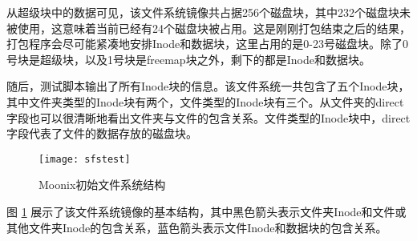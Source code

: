 从超级块中的数据可见，该文件系统镜像共占据256个磁盘块，其中232个磁盘块未被使用，这意味着当前已经有24个磁盘块被占用。这是刚刚打包结束之后的结果，打包程序会尽可能紧凑地安排Inode和数据块，这里占用的是0-23号磁盘块。除了0号块是超级块，以及1号块是freemap块之外，剩下的都是Inode和数据块。

随后，测试脚本输出了所有Inode块的信息。该文件系统一共包含了五个Inode块，其中文件夹类型的Inode块有两个，文件类型的Inode块有三个。从文件夹的direct字段也可以很清晰地看出文件夹与文件的包含关系。文件类型的Inode块中，direct字段代表了文件的数据存放的磁盘块。

\begin{figure}[htpb]
	\centering
	\texttt{[image: sfstest]}
	\setlength{\abovecaptionskip}{2pt}
	\caption{Moonix初始文件系统结构}
	\label{pic:sfstest}
\end{figure}

图 \ref{pic:sfstest} 展示了该文件系统镜像的基本结构，其中黑色箭头表示文件夹Inode和文件或其他文件夹Inode的包含关系，蓝色箭头表示文件Inode和数据块的包含关系。